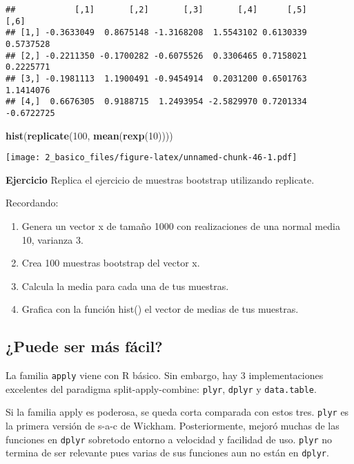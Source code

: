 \documentclass[]{article}
\newenvironment{Shaded}{\begin{snugshade}}{\end{snugshade}}
\newcommand{\KeywordTok}[1]{\textcolor[rgb]{0.13,0.29,0.53}{\textbf{{#1}}}}
\newcommand{\DecValTok}[1]{\textcolor[rgb]{0.00,0.00,0.81}{{#1}}}
\newcommand{\NormalTok}[1]{{#1}}
\begin{document}
\begin{verbatim}
##            [,1]       [,2]       [,3]       [,4]      [,5]       [,6]
## [1,] -0.3633049  0.8675148 -1.3168208  1.5543102 0.6130339  0.5737528
## [2,] -0.2211350 -0.1700282 -0.6075526  0.3306465 0.7158021  0.2225771
## [3,] -0.1981113  1.1900491 -0.9454914  0.2031200 0.6501763  1.1414076
## [4,]  0.6676305  0.9188715  1.2493954 -2.5829970 0.7201334 -0.6722725
\end{verbatim}

\begin{Shaded}
\begin{Highlighting}[]
\KeywordTok{hist}\NormalTok{(}\KeywordTok{replicate}\NormalTok{(}\DecValTok{100}\NormalTok{, }\KeywordTok{mean}\NormalTok{(}\KeywordTok{rexp}\NormalTok{(}\DecValTok{10}\NormalTok{))))}
\end{Highlighting}
\end{Shaded}

\texttt{[image: 2\_basico\_files/figure-latex/unnamed-chunk-46-1.pdf]}

\textbf{Ejercicio} Replica el ejercicio de muestras bootstrap utilizando
replicate.

Recordando:

\begin{enumerate}
\item Genera un vector x de tamaño 1000 con realizaciones de una normal media 10, varianza 3. 
\item Crea 100 muestras bootstrap del vector x.
\item Calcula la media para cada una de tus muestras.
\item Grafica con la función hist() el vector de medias de tus muestras.
\end{enumerate}

\subsection{¿Puede ser más fácil?}\label{puede-ser-mas-facil}

La familia \texttt{apply} viene con R básico. Sin embargo, hay 3
implementaciones excelentes del paradigma split-apply-combine:
\texttt{plyr}, \texttt{dplyr} y \texttt{data.table}.

Si la familia apply es poderosa, se queda corta comparada con estos
tres. \texttt{plyr} es la primera versión de s-a-c de Wickham.
Posteriormente, mejoró muchas de las funciones en \texttt{dplyr}
sobretodo entorno a velocidad y facilidad de uso. \texttt{plyr} no
termina de ser relevante pues varias de sus funciones aun no están en
\texttt{dplyr}.
\end{document}
